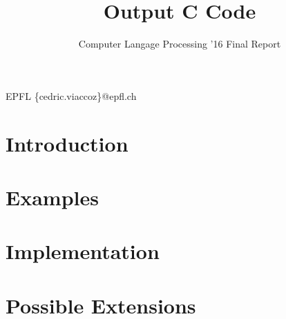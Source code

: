 \documentclass[nocopyrightspace,11pt,authoryear,preprint]{sigplanconf}
\begin{document}


\title{Output C Code}
\subtitle{Computer Langage Processing '16 Final Report}

           {EPFL}
           {\{cedric.viaccoz\}@epfl.ch}

\maketitle

\section{Introduction}


\section{Examples}


\section{Implementation}


\section{Possible Extensions}




\end{document}
